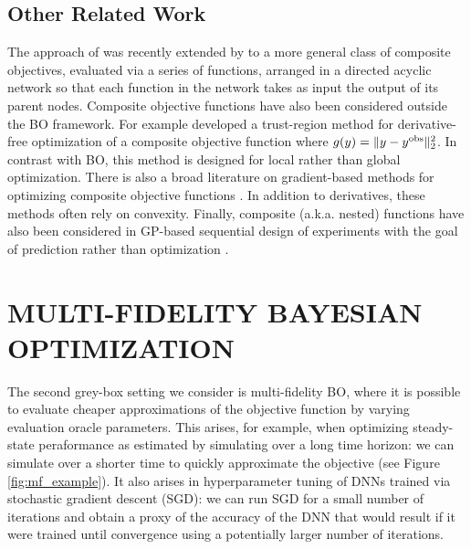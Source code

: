 \documentclass{wscpaperproc}
\newcommand{\savelength}[1]{} %
\theoremstyle{wsc}
\begin{document}
\subsection{Other Related Work}
The approach of  was recently extended by  to a more general class of composite objectives, evaluated via a series of functions, arranged in a directed acyclic network so that each function in the network takes as input the output of its parent nodes. Composite objective functions have also been considered outside the BO framework. For example  developed a trust-region method for derivative-free optimization of a composite objective function where  $g(y)=\|y - y^{\textnormal{obs}}\|_2^2$. In contrast with BO, this method is designed for local rather than global optimization. There is also a broad literature on gradient-based methods for optimizing composite objective functions . In addition to derivatives, these methods often rely on convexity. Finally, composite (a.k.a. nested) functions have also been considered in GP-based sequential design of experiments with the goal of prediction rather than optimization .

\section{MULTI-FIDELITY BAYESIAN OPTIMIZATION}
\label{sec:multifidelity-BO}
The second grey-box setting we consider is multi-fidelity BO, where it is possible to evaluate cheaper approximations of the objective function by varying evaluation oracle parameters. This arises, for example, when optimizing steady-state peraformance as estimated by simulating over a long time horizon: we can simulate over a shorter time to quickly approximate the objective (see Figure \ref{fig:mf_example}). It also arises in hyperparameter tuning of DNNs trained via stochastic gradient descent (SGD): we can run SGD for a small number of iterations and obtain a proxy of the accuracy of the DNN that would result if it were trained until convergence using a potentially larger number of iterations. \savelength{In this case, in addition, we get to observe not only the accuracy of the model at the last iteration but also at every iteration of the SGD routine.} 
\savelength{Finally, it also arises in the calibration of expensive simulators that require numerically solving a system of complex PDEs: we can reduce the size of the grid in which the system of PDEs is solved to obtain a faster-to-evaluate approximation of the objective function.}
\end{document}

